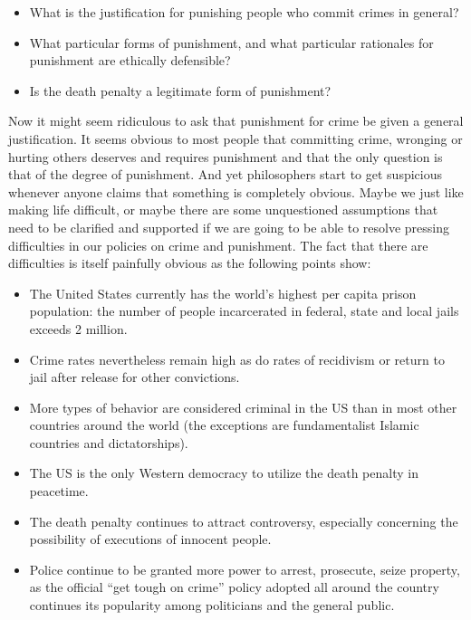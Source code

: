\documentclass[
  12pt, openany]{book}
\makeatletter
\providecommand{\tightlist}{%
  \setlength{\itemsep}{0pt}\setlength{\parskip}{0pt}}
\newenvironment{kframe}{%
\medskip{}
\setlength{\fboxsep}{.8em}
 \def\at@end@of@kframe{}%
 \ifinner\ifhmode%
  \def\at@end@of@kframe{\end{minipage}}%
  \begin{minipage}{\columnwidth}%
 \fi\fi%
 \def\FrameCommand##1{\hskip\@totalleftmargin \hskip-\fboxsep
 \colorbox{shadecolor}{##1}\hskip-\fboxsep
     \hskip-\linewidth \hskip-\@totalleftmargin \hskip\columnwidth}%
 \MakeFramed {\advance\hsize-\width
   \@totalleftmargin\z@ \linewidth\hsize
   \@setminipage}}%
 {\par\unskip\endMakeFramed%
 \at@end@of@kframe}
\newenvironment{rmdblock}[1]
  {
  \begin{itemize}
  \renewcommand{\labelitemi}{
    \raisebox{-.7\height}[0pt][0pt]{
      {\setkeys{Gin}{width=3em,keepaspectratio}\texttt{[image: img/\#1]}}
    }
  }
  \setlength{\fboxsep}{1em}
  \begin{kframe}
  \item
  }
  {
  \end{kframe}
  \end{itemize}
  }
\newenvironment{question}
  {\begin{rmdblock}{question}}
  {\end{rmdblock}}
\theoremstyle{definition}
\theoremstyle{definition}
\theoremstyle{definition}
\theoremstyle{remark}
\makeatother
\begin{document}
\begin{question}

\begin{itemize}
\tightlist
\item
  What is the justification for punishing people who commit crimes in general?
\item
  What particular forms of punishment, and what particular rationales for punishment are ethically defensible?
\item
  Is the death penalty a legitimate form of punishment?
\end{itemize}

\end{question}

Now it might seem ridiculous to ask that punishment for crime be given a general justification. It seems obvious to most people that committing crime, wronging or hurting others deserves and requires punishment and that the only question is that of the degree of punishment. And yet philosophers start to get suspicious whenever anyone claims that something is completely obvious. Maybe we just like making life difficult, or maybe there are some unquestioned assumptions that need to be clarified and supported if we are going to be able to resolve pressing difficulties in our policies on crime and punishment. The fact that there are difficulties is itself painfully obvious as the following points show:

\begin{itemize}
\tightlist
\item
  The United States currently has the world's highest per capita prison population: the number of people incarcerated in federal, state and local jails exceeds 2 million.
\item
  Crime rates nevertheless remain high as do rates of recidivism or return to jail after release for other convictions.
\item
  More types of behavior are considered criminal in the US than in most other countries around the world (the exceptions are fundamentalist Islamic countries and dictatorships).
\item
  The US is the only Western democracy to utilize the death penalty in peacetime.
\item
  The death penalty continues to attract controversy, especially concerning the possibility of executions of innocent people.
\item
  Police continue to be granted more power to arrest, prosecute, seize property, as the official ``get tough on crime'' policy adopted all around the country continues its popularity among politicians and the general public.
\end{itemize}
\end{document}

